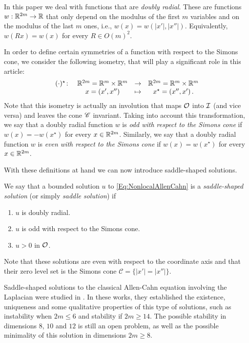 In this paper we deal with functions that are \emph{doubly radial}. These are functions $w:\mathbb{R}^{2m}  \to \mathbb{R}$ that only depend on the modulus of the first $m$ variables and on the modulus of the last $m$ ones, i.e., $w(x) = w(|x'|,|x''|)$. Equivalently, $w(Rx) = w(x)$ for every $R \in O(m)^2$.

In order to define certain symmetries of a function with respect to the Simons cone, we consider the following isometry, that will play a significant role in this article:
\begin{equation}
\label{Eq:DefStar}
\begin{matrix}
(\cdot)^\star \colon & \mathbb{R}^{2m}= \mathbb{R}^{m}\times \mathbb{R}^{m}  &\to&  \mathbb{R}^{2m}= \mathbb{R}^{m}\times \mathbb{R}^{m}  \\
& x = (x',x'') &\mapsto & x^\star = (x'',x')\,.
\end{matrix}
\end{equation}
Note that this isometry is actually an involution that maps $\mathcal{O}$ into $\mathcal{I}$ (and vice versa) and leaves the cone $\mathscr{C}$ invariant. Taking into account this transformation, we say that a doubly radial function $w$ is \emph{odd with respect to the Simons cone} if $w(x) = -w(x^\star)$ for every $x\in \mathbb{R}^{2m}$. Similarly, we say that a doubly radial function $w$ is \emph{even with respect to the Simons cone} if $w(x) = w(x^\star)$ for every $x\in \mathbb{R}^{2m}$.


With these definitions at hand we can now introduce saddle-shaped solutions.
\begin{definition}
	\label{Def:SaddleShapedSol}
	We say that a bounded solution $u$ to \eqref{Eq:NonlocalAllenCahn} is a \emph{saddle-shaped solution} (or simply \emph{saddle solution}) if
	\begin{enumerate}
		\item $u$ is doubly radial.
		\item $u$ is odd with respect to the Simons cone.
		\item $u > 0$ in $\mathcal{O}$.
	\end{enumerate}
\end{definition}
Note that these solutions are even with respect to the coordinate axis and that their zero level set is the Simons cone $\mathscr{C} = \{|x'|=|x''|\}$. 


Saddle-shaped solutions to the classical Allen-Cahn equation involving the Laplacian were studied in \cite{DangFifePeletier, Schatzman, CabreTerraI,CabreTerraII, Cabre-Saddle}. In these works, they established the existence, uniqueness and some qualitative properties of this type of solutions, such as instability when $2m\leq 6$ and stability if $2m\geq 14$. The possible stability in dimensions $8$, $10$ and $12$ is still an open problem, as well as the possible minimality of this solution in dimensions $2m \geq 8$.


